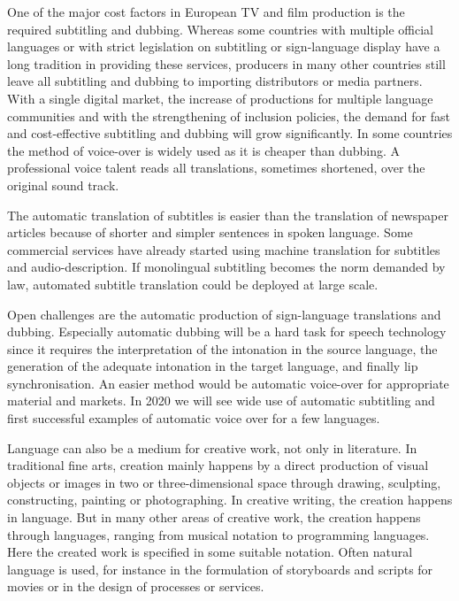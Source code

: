 \documentclass[10pt, plain]{../../metanetpaper}
\begin{document}
\begin{multicols}{2}
One of the major cost factors in European TV and film production is the required subtitling and dubbing. Whereas some countries with multiple official languages or with strict legislation on subtitling or sign-language display have a long tradition in providing these services, producers in many other countries still leave all subtitling and dubbing to importing distributors or media partners. With a single digital market, the increase of productions for multiple language communities and with the strengthening of inclusion policies, the demand for fast and cost-effective subtitling and dubbing will grow significantly. In some countries the method of voice-over is widely used as it is cheaper than dubbing. A professional voice talent reads all translations, sometimes shortened, over the original sound track. %
 
The automatic translation of subtitles is easier than the translation of newspaper articles because of shorter and simpler sentences in spoken language. Some commercial services have already started using machine translation for subtitles and audio-description. If monolingual subtitling becomes the norm demanded by law, automated subtitle translation could be deployed at large scale.
 
Open challenges are the automatic production of sign-language translations and dubbing. Especially automatic dubbing will be a hard task for speech technology since it requires the interpretation of the intonation in the source language, the generation of the adequate intonation in the target language, and finally lip synchronisation. An easier method would be automatic voice-over for appropriate material and markets. In 2020 we will see wide use of automatic subtitling and first successful examples of automatic voice over for a few languages.
 
Language can also be a medium for creative work, not only in literature. In traditional fine arts, creation mainly happens by a direct production of visual objects or images in two or three-dimensional space through drawing, sculpting, constructing, painting or photographing. In creative writing, the creation happens in language. But in many other areas of creative work, the creation happens through languages, ranging from musical notation to programming languages. Here the created work is specified in some suitable notation. Often natural language is used, for instance in the formulation of storyboards and scripts for movies or in the design of processes or services.


\end{multicols}
\end{document}
